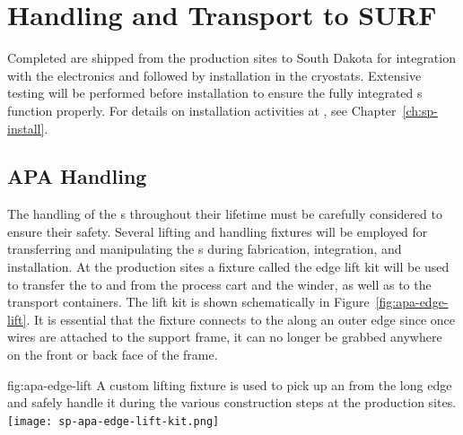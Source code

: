 \section{Handling and Transport to SURF} %
\label{sec:fdsp-apa-transport}

Completed  are shipped from the  production sites to South Dakota for integration with the   electronics and  followed by installation in the  cryostats.  %
Extensive  testing will be performed before installation to ensure the fully integrated s function properly.  %
For details on installation activities at \surf, see Chapter~\ref{ch:sp-install}. 

\subsection{APA Handling}
\label{sec:fdsp-apa-transport-handling}

The handling of the s throughout their lifetime must be carefully considered to ensure their safety.  Several lifting and handling fixtures will be employed for transferring and manipulating the s during fabrication, integration, and installation.  At the production sites a fixture called the edge lift kit will be used to transfer the  to and from the process cart and the winder, as well as to the transport containers.  The lift kit is shown schematically in Figure~\ref{fig:apa-edge-lift}.  It is essential that the fixture connects to the  along an outer edge since once wires are attached to the support frame, it can no longer be grabbed anywhere on the front or back face of the frame. 

\begin{dunefigure}{fig:apa-edge-lift}
{A custom lifting fixture is used to pick up an  from the long edge and safely handle it during the various construction steps at the production sites.}  
\texttt{[image: sp-apa-edge-lift-kit.png]} 
\end{dunefigure}



